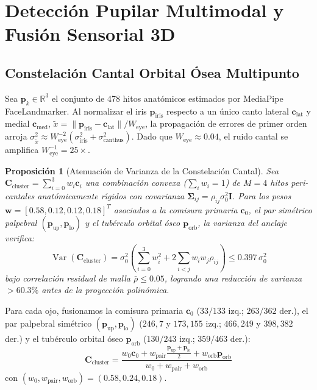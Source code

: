 \documentclass[twocolumn,10pt]{article}
\newtheorem{proposition}{Proposici\'on}
\begin{document}
\section{Detecci\'on Pupilar Multimodal y Fusi\'on Sensorial 3D}
\label{sec:sensing}

\subsection{Constelaci\'on Cantal Orbital \'Osea Multipunto}
Sea $\mathbf{p}_k \in \mathbb{R}^3$ el conjunto de 478 hitos anat\'omicos estimados por MediaPipe FaceLandmarker. Al normalizar el iris $\mathbf{p}_{\text{iris}}$ respecto a un \'unico canto lateral $\mathbf{c}_{\text{lat}}$ y medial $\mathbf{c}_{\text{med}}$, $\tilde{x} = \|\mathbf{p}_{\text{iris}} - \mathbf{c}_{\text{lat}}\| / W_{\text{eye}}$, la propagaci\'on de errores de primer orden arroja $\sigma_{\tilde{x}}^2 \approx W_{\text{eye}}^{-2}(\sigma_{\text{iris}}^2 + \sigma_{\text{canthus}}^2)$. Dado que $W_{\text{eye}} \approx 0.04$, el ruido cantal se amplifica $W_{\text{eye}}^{-1} = 25\times$.

\begin{proposition}[Atenuaci\'on de Varianza de la Constelaci\'on Cantal]
Sea $\mathbf{C}_{\text{cluster}} = \sum_{i=0}^{3} w_i \mathbf{c}_i$ una combinaci\'on convexa ($\sum_i w_i = 1$) de $M=4$ hitos peri-cantales anat\'omicamente r\'{\i}gidos con covarianza $\mathbf{\Sigma}_{ij} = \rho_{ij}\sigma_0^2 \mathbf{I}$. Para los pesos $\mathbf{w} = [0.58, 0.12, 0.12, 0.18]^T$ asociados a la comisura primaria $\mathbf{c}_0$, el par sim\'etrico palpebral $(\mathbf{p}_{\text{up}}, \mathbf{p}_{\text{lo}})$ y el tub\'erculo orbital \'oseo $\mathbf{p}_{\text{orb}}$, la varianza del anclaje verifica:
\begin{equation}
\operatorname{Var}(\mathbf{C}_{\text{cluster}}) = \sigma_0^2 \left(\sum_{i=0}^3 w_i^2 + 2\sum_{i<j} w_i w_j \rho_{ij}\right) \le 0.397\,\sigma_0^2
\end{equation}
bajo correlaci\'on residual de malla $\bar{\rho} \le 0.05$, logrando una reducci\'on de varianza $>60.3\%$ antes de la proyecci\'on polin\'omica.
\end{proposition}

Para cada ojo, fusionamos la comisura primaria $\mathbf{c}_0$ ($33/133$ izq.; $263/362$ der.), el par palpebral sim\'etrico $(\mathbf{p}_{\text{up}}, \mathbf{p}_{\text{lo}})$ ($246,7$ y $173,155$ izq.; $466,249$ y $398,382$ der.) y el tub\'erculo orbital \'oseo $\mathbf{p}_{\text{orb}}$ ($130/243$ izq.; $359/463$ der.):
\begin{equation}
\mathbf{C}_{\text{cluster}} = \frac{w_0 \mathbf{c}_0 + w_{\text{pair}} \frac{\mathbf{p}_{\text{up}} + \mathbf{p}_{\text{lo}}}{2} + w_{\text{orb}} \mathbf{p}_{\text{orb}}}{w_0 + w_{\text{pair}} + w_{\text{orb}}}
\end{equation}
con $(w_0, w_{\text{pair}}, w_{\text{orb}}) = (0.58, 0.24, 0.18)$.
\end{document}
